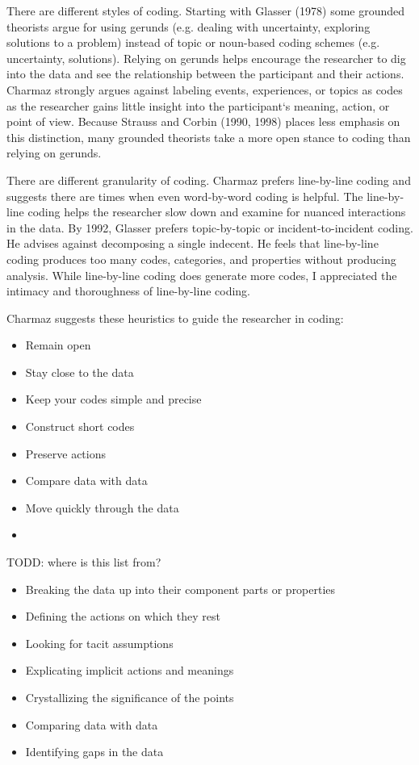 There are different styles of coding. Starting with Glasser (1978) some grounded theorists argue for using gerunds (e.g. dealing with uncertainty, exploring solutions to a problem) instead of topic or noun-based coding schemes (e.g. uncertainty, solutions). Relying on gerunds helps encourage the researcher to dig into the data and see the relationship between the participant and their actions. Charmaz strongly argues against labeling events, experiences, or topics as codes as the researcher gains little insight into the participant`s meaning, action, or point of view. Because Strauss and Corbin (1990, 1998) places less emphasis on this distinction, many grounded theorists take a more open stance to coding than relying on gerunds.

There are different granularity of coding. Charmaz prefers line-by-line coding and suggests there are times when even word-by-word coding is helpful. The line-by-line coding helps the researcher slow down and examine for nuanced interactions in the data. By 1992, Glasser prefers topic-by-topic or incident-to-incident coding. He advises against decomposing a single indecent. He feels that line-by-line coding produces too many codes, categories, and properties without producing analysis. While line-by-line coding does generate more codes, I appreciated the intimacy and thoroughness of line-by-line coding.

Charmaz suggests these heuristics to guide the researcher in coding:
\begin{itemize}
\item Remain open
\item Stay close to the data
\item Keep your codes simple and precise
\item Construct short codes
\item Preserve actions
\item Compare data with data
\item Move quickly through the data
\item \end{itemize}

TODD: where is this list from?
\begin{itemize}
\item Breaking the data up into their component parts or properties
\item Defining the actions on which they rest
\item Looking for tacit assumptions
\item Explicating implicit actions and meanings
\item Crystallizing the significance of the points
\item Comparing data with data
\item Identifying gaps in the data
\end{itemize}

